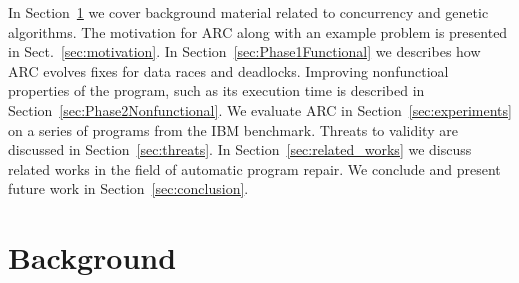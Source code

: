 \documentclass[runningheads,a4paper]{llncs}
\begin{document}
In Section~\ref{sec:background} we cover background material related to concurrency and genetic algorithms. The motivation for ARC along with an example problem is presented in Sect.~\ref{sec:motivation}. In Section~\ref{sec:Phase1Functional} we describes how ARC evolves fixes for data races and deadlocks. Improving nonfunctioal properties of the program, such as its execution time is described in Section~\ref{sec:Phase2Nonfunctional}. We evaluate ARC in Section~\ref{sec:experiments} on a series of programs from the IBM benchmark. Threats to validity are discussed in Section~\ref{sec:threats}. In Section~\ref{sec:related_works} we discuss related works in the field of automatic program repair.  We conclude and present future work in Section~\ref{sec:conclusion}.

\section{Background}
\label{sec:background}



\end{document}
